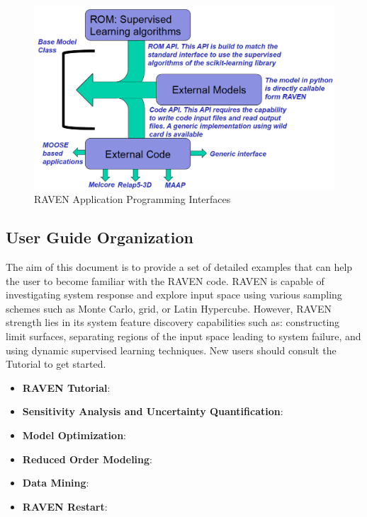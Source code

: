 \begin{figure}[h!]
  \includegraphics[width=\textwidth]{pics/modelAPIs.png}
  \caption{RAVEN Application Programming Interfaces}
  \label{fig:modelAPIs}
\end{figure}

\subsection{User Guide Organization}
The aim of this document is to provide a set of detailed examples that can help the user to become familiar with
the RAVEN code. RAVEN is capable of investigating system response and explore input space using various
sampling schemes such as Monte Carlo, grid, or Latin Hypercube. However, RAVEN strength lies in its system feature
discovery capabilities such as: constructing limit surfaces, separating regions of the input space leading to
system failure, and using dynamic supervised learning techniques. New users should consult the Tutorial to get started.
\begin{itemize}
  \item \textbf{RAVEN Tutorial}:
  \item \textbf{Sensitivity Analysis and Uncertainty Quantification}:
  \item \textbf{Model Optimization}:
  \item \textbf{Reduced Order Modeling}:
  \item \textbf{Data Mining}:
  \item \textbf{RAVEN Restart}:
\end{itemize}



